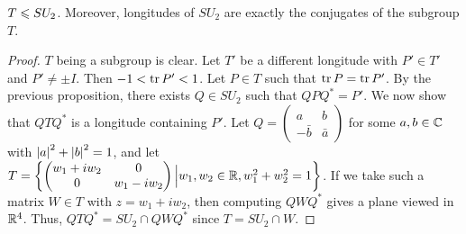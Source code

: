 \begin{proposition}
    $T \leqslant SU_{2}$. Moreover, longitudes of $SU_{2}$ are exactly the conjugates of the subgroup $T$.
\end{proposition}
\begin{proof}
    $T$ being a subgroup is clear. Let $T'$ be a different longitude with $P' \in T'$ and $P' \neq \pm I$. Then $-1 < \operatorname{tr} P' < 1$. Let $P \in T$ such that $\operatorname{tr} P = \operatorname{tr} P'$. By the previous proposition, there exists $Q \in SU_{2}$ such that $QPQ^{\ast} = P'$. We now show that $QTQ^{\ast}$ is a longitude containing $P'$. Let $Q = \begin{pmatrix}
        a & b \\ -\bar{b} & \bar{a}
    \end{pmatrix}$ for some $a,b \in \mathbb{C}$ with $\left| a \right|^{2} + \left| b \right|^{2} = 1$, and let $T = \left\{ \begin{pmatrix}
        w_{1} + iw_{2} & 0 \\ 0 & w_{1} - iw_{2}
    \end{pmatrix} \Big| w_{1},w_{2} \in \mathbb{R}, w_{1}^{2} + w_{2}^{2} = 1 \right\}$. If we take such a matrix $W \in T$ with $z = w_{1}+iw_{2}$, then computing $QWQ^{\ast}$ gives a plane viewed in $\mathbb{R}^{4}$. Thus, $QTQ^{\ast} = SU_{2} \cap QWQ^{\ast}$ since $T = SU_{2} \cap W$.
\end{proof}